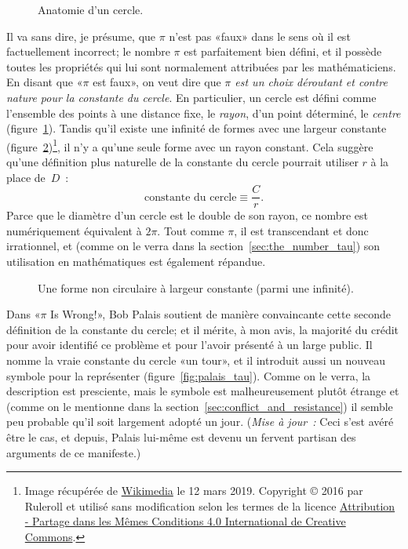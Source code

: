 \begin{figure}
\caption{Anatomie d'un cercle.\label{fig:circle}}
\end{figure}

Il va sans dire, je présume, que $\pi$ n'est pas «\ns faux\ns » dans le sens où il
est factuellement incorrect\ns; le nombre $\pi$ est parfaitement bien défini,
et il possède toutes les propriétés qui lui sont normalement attribuées par
les mathématiciens. En disant que «\ns $\pi$ est faux\ns », on veut dire que
\emph{$\pi$ est un choix déroutant et contre nature pour la constante du
cercle}. En particulier, un cercle est défini comme l'ensemble des points à
une distance fixe, le \emph{rayon}, d'un point déterminé, le \emph{centre} (figure~\ref{fig:circle}).
Tandis qu'il existe une infinité de formes avec une
largeur constante (figure~\ref{fig:constant_width})\ns\footnote{Image
récupérée de
\href{https://commons.wikimedia.org/wiki/File:Reuleaux_triangle_roll.gif}{Wikimedia}
le 12 mars 2019. Copyright © 2016 par Ruleroll et utilisé sans
modification selon les termes de la licence
\href{https://creativecommons.org/licenses/by-sa/4.0/deed.fr}{Attribution -
Partage dans les Mêmes Conditions 4.0 International de Creative Commons}.}, il
n'y a qu'une seule forme avec un rayon constant. Cela suggère qu'une
définition plus naturelle de la constante du cercle pourrait utiliser $r$ à la
place de~$D$~:
\begin{equation}
\label{eq:circle_constant}
\mbox{constante du cercle} \equiv \frac{C}{r}.
\end{equation}
Parce que le diamètre d'un cercle est le double de son rayon, ce nombre est
numériquement équivalent à $2\pi$. Tout comme $\pi$, il est transcendant et donc
irrationnel, et (comme on le verra dans la section~\ref{sec:the_number_tau})
son utilisation en mathématiques est également répandue.

\begin{figure}
\caption{Une forme non circulaire à largeur
	constante (parmi une infinité).\label{fig:constant_width}}
\end{figure}

Dans «\ns $\pi$ Is Wrong!\ns », Bob Palais soutient de manière convaincante
cette seconde définition de la constante du cercle\ns; et il mérite, à mon
avis, la majorité du crédit pour avoir identifié ce problème et pour
l'avoir présenté à un large public. Il nomme la vraie constante du cercle «\ns un
tour\ns », et il introduit aussi un nouveau symbole pour la représenter
(figure~\ref{fig:palais_tau}). Comme on le verra, la description est presciente,
mais le symbole est malheureusement plutôt étrange et (comme on le mentionne dans la
section~\ref{sec:conflict_and_resistance}) il semble peu probable qu'il soit
largement adopté un jour. (\emph{Mise à jour~:} Ceci s'est avéré être le cas,
et depuis, Palais lui-même est devenu un fervent partisan des arguments de
ce manifeste.)


